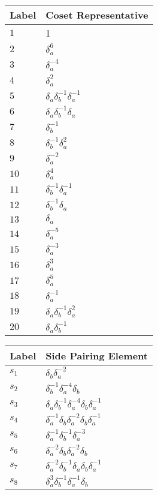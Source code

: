 \documentclass{article}
\begin{document}
\begin{center}
\begin{tabular}{ll}
\toprule
Label & Coset Representative\\
\midrule
$1$ & 1 \\
$2$ & $\delta_a^{6}$ \\
$3$ & $\delta_a^{-4}$ \\
$4$ & $\delta_a^{2}$ \\
$5$ & $\delta_a^{}\delta_b^{-1}\delta_a^{-1}$ \\
$6$ & $\delta_a^{}\delta_b^{-1}\delta_a^{}$ \\
$7$ & $\delta_b^{-1}$ \\
$8$ & $\delta_b^{-1}\delta_a^{2}$ \\
$9$ & $\delta_a^{-2}$ \\
$10$ & $\delta_a^{4}$ \\
$11$ & $\delta_b^{-1}\delta_a^{-1}$ \\
$12$ & $\delta_b^{-1}\delta_a^{}$ \\
$13$ & $\delta_a^{}$ \\
$14$ & $\delta_a^{-5}$ \\
$15$ & $\delta_a^{-3}$ \\
$16$ & $\delta_a^{3}$ \\
$17$ & $\delta_a^{5}$ \\
$18$ & $\delta_a^{-1}$ \\
$19$ & $\delta_a^{}\delta_b^{-1}\delta_a^{2}$ \\
$20$ & $\delta_a^{}\delta_b^{-1}$ \\
\bottomrule
\end{tabular}
\hfill
\begin{tabular}{ll}
\toprule
Label & Side Pairing Element\\
\midrule
$s_{1}$ & $\delta_b^{}\delta_a^{-2}$ \\
$s_{2}$ & $\delta_b^{-1}\delta_a^{-4}\delta_b^{}$ \\
$s_{3}$ & $\delta_a^{}\delta_b^{-1}\delta_a^{-4}\delta_b^{}\delta_a^{-1}$ \\
$s_{4}$ & $\delta_a^{-1}\delta_b^{}\delta_a^{-2}\delta_b^{}\delta_a^{-1}$ \\
$s_{5}$ & $\delta_a^{-1}\delta_b^{-1}\delta_a^{-3}$ \\
$s_{6}$ & $\delta_a^{-2}\delta_b^{}\delta_a^{-2}\delta_b^{}$ \\
$s_{7}$ & $\delta_a^{-2}\delta_b^{-1}\delta_a^{}\delta_b^{}\delta_a^{-1}$ \\
$s_{8}$ & $\delta_a^{3}\delta_b^{-1}\delta_a^{-1}\delta_b^{}$ \\

\end{tabular}
\end{center}
\end{document}
